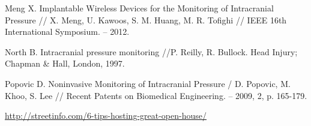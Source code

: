 \newpage

  
\begin{thebibliography}{99}

{}\label{literatura}


Meng X. Implantable Wireless Devices for the Monitoring of Intracranial 
Pressure // X. Meng, U. Kawoos, S. M. Huang, M. R. Tofighi // IEEE 16th International Symposium. -- 2012.


North B. Intracranial pressure monitoring //P. Reilly, R. Bullock. Head Injury; Chapman \& Hall, London, 1997.

Popovic D. Noninvasive Monitoring of Intracranial Pressure / D. Popovic, M. Khoo, S. Lee // Recent Patents on Biomedical Engineering. -- 2009, 2, p. 165-179.

\url{http://streetinfo.com/6-tips-hosting-great-open-house/}

\end{thebibliography}
